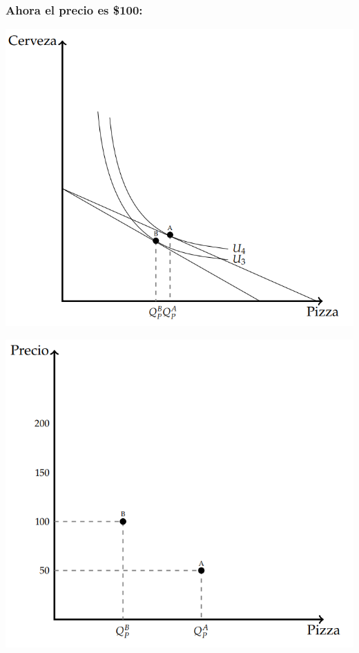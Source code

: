 \documentclass{beamer}
\begin{document}
\begin{frame}
\frametitle{Ahora el precio es \$100:}
\begin{center}
  \begin{minipage}{0.48\textwidth}
      \includegraphics[width=\linewidth]{../Figures/C8.13.png}
  \end{minipage}\hfill
  \begin{minipage}{0.48\textwidth}
      \includegraphics[width=\linewidth]{../Figures/C8.14.png}
  \end{minipage}
\end{center}
\end{frame}
\end{document}
